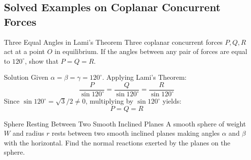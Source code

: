 \documentclass[11pt,a4paper]{article}
\begin{document}
\subsection{Solved Examples on Coplanar Concurrent Forces}

\begin{examplebox}{Three Equal Angles in Lami's Theorem}
Three coplanar concurrent forces $P, Q, R$ act at a point $O$ in equilibrium. If the angles between any pair of forces are equal to $120^\circ$, show that $P = Q = R$.
\end{examplebox}

\begin{proofbox}{Solution}
Given $\alpha = \beta = \gamma = 120^\circ$. Applying Lami's Theorem:
\[
\frac{P}{\sin 120^\circ} = \frac{Q}{\sin 120^\circ} = \frac{R}{\sin 120^\circ}
\]
Since $\sin 120^\circ = \sqrt{3}/2 \neq 0$, multiplying by $\sin 120^\circ$ yields:
\begin{equation}
P = Q = R
\end{equation}
\end{proofbox}

\begin{examplebox}{Sphere Resting Between Two Smooth Inclined Planes}
A smooth sphere of weight $W$ and radius $r$ rests between two smooth inclined planes making angles $\alpha$ and $\beta$ with the horizontal. Find the normal reactions exerted by the planes on the sphere.
\end{examplebox}

\begin{center}
\end{center}
\end{document}
